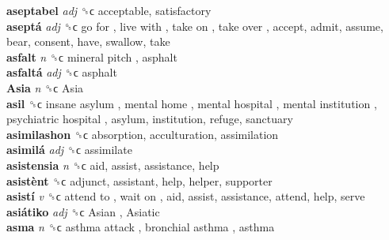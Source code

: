 \textbf{aseptabel} \emph{adj}  ␝ϲ  acceptable, satisfactory  \\
\textbf{aseptá} \emph{adj}  ␝ϲ   go for ,  live with ,  take on ,  take over , accept, admit, assume, bear, consent, have, swallow, take  \\
\textbf{asfalt} \emph{n}  ␝ϲ   mineral pitch , asphalt  \\
\textbf{asfaltá} \emph{adj}  ␝ϲ  asphalt  \\
\textbf{Asia} \emph{n}  ␝ϲ   Asia   \\
\textbf{asil} ␝ϲ   insane asylum ,  mental home ,  mental hospital ,  mental institution ,  psychiatric hospital , asylum, institution, refuge, sanctuary  \\
\textbf{asimilashon} ␝ϲ  absorption, acculturation, assimilation  \\
\textbf{asimilá} \emph{adj}  ␝ϲ  assimilate  \\
\textbf{asistensia} \emph{n}  ␝ϲ  aid, assist, assistance, help  \\
\textbf{asistènt} ␝ϲ  adjunct, assistant, help, helper, supporter  \\
\textbf{asistí} \emph{v}  ␝ϲ   attend to ,  wait on , aid, assist, assistance, attend, help, serve  \\
\textbf{asiátiko} \emph{adj}  ␝ϲ   Asian ,  Asiatic   \\
\textbf{asma} \emph{n}  ␝ϲ   asthma attack ,  bronchial asthma , asthma  \\
